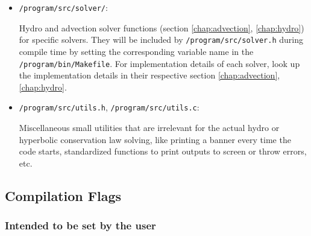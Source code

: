 \begin{itemize}
	\item 	\texttt{/program/src/solver/}:
	
			Hydro and advection solver functions (section \ref{chap:advection}, \ref{chap:hydro}) for specific  solvers.
			They will be included by \texttt{/program/src/solver.h} during compile time by setting the corresponding variable name in the \texttt{/program/bin/Makefile}.
			For implementation details of each solver, look up the implementation details in their respective section \ref{chap:advection}, \ref{chap:hydro}.

	\item 	\texttt{/program/src/utils.h}, \texttt{/program/src/utils.c}:
	
			Miscellaneous small utilities that are irrelevant for the actual hydro or hyperbolic conservation law solving, like printing a banner every time the code starts, standardized functions to print outputs to screen or throw errors, etc.

\end{itemize}

	















\subsection{Compilation Flags}

\subsubsection{Intended to be set by the user}

